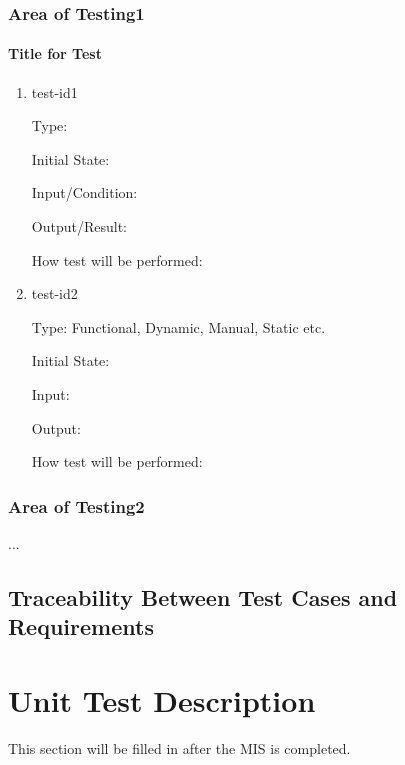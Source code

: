 \documentclass[12pt, titlepage]{article}
\begin{document}

\subsubsection{Area of Testing1}
		
\paragraph{Title for Test}

\begin{enumerate}

\item{test-id1\\}

Type: 
					
Initial State: 
					
Input/Condition: 
					
Output/Result: 
					
How test will be performed: 
					
\item{test-id2\\}

Type: Functional, Dynamic, Manual, Static etc.
					
Initial State: 
					
Input: 
					
Output: 
					
How test will be performed: 

\end{enumerate}

\subsubsection{Area of Testing2}

...

\subsection{Traceability Between Test Cases and Requirements}


\section{Unit Test Description}
This section will be filled in after the MIS is completed. 
\end{document}
